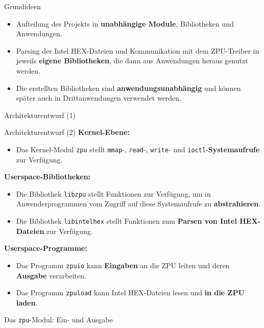 \documentclass[10pt]{beamer}
\begin{document}
	\begin{frame}{Grundideen}
		\begin{itemize}
			\item Aufteilung des Projekts in \textbf{unabhängige Module}, Bibliotheken und Anwendungen.
			\item Parsing der Intel HEX-Dateien und Kommunikation mit dem ZPU-Treiber in jeweils \textbf{eigene Bibliotheken}, die dann aus Anwendungen heraus genutzt werden.
			\item Die erstellten Bibliotheken sind \textbf{anwendungsunabhängig} und können später auch in Drittanwendungen verwendet werden.
		\end{itemize}
	\end{frame}

	\begin{frame}{Architekturentwurf (1)}
	\begin{center}
		
	\end{center}
	\end{frame}
	
	\begin{frame}{Architekturentwurf (2)}
		\textbf{Kernel-Ebene:}
		\begin{itemize}
			\item Das Kernel-Modul \texttt{zpu} stellt \texttt{mmap}-, \texttt{read}-, \texttt{write}- und \texttt{ioctl}-\textbf{Systemaufrufe} zur Verfügung.
		\end{itemize}
		\textbf{Userspace-Bibliotheken:}
		\begin{itemize}
			\item Die Bibliothek \texttt{libzpu} stellt Funktionen zur Verfügung, um in Anwenderprogrammen vom Zugriff auf diese Systemaufrufe zu \textbf{abstrahieren}.
			\item Die Bibliothek \texttt{libintelhex} stellt Funktionen zum \textbf{Parsen von Intel HEX-Dateien} zur Verfügung.
		\end{itemize}
		\textbf{Userspace-Programme:}
		\begin{itemize}
			\item Das Programm \texttt{zpuio} kann \textbf{Eingaben} an die ZPU leiten und deren \textbf{Ausgabe} verarbeiten.
			\item Das Programm \texttt{zpuload} kann Intel HEX-Dateien lesen und \textbf{in die ZPU laden}.
		\end{itemize}
	\end{frame}
	
	\begin{frame}{Das \texttt{zpu}-Modul: Ein- und Ausgabe}
		\begin{center}
			
		\end{center}
	\end{frame}
	
\end{document}
